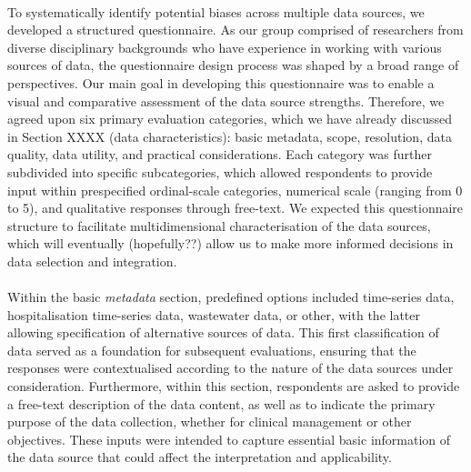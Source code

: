 \documentclass{article}
\begin{document}
\paragraph{}To systematically identify potential biases across multiple data sources, we developed a structured questionnaire. As our group comprised of researchers from diverse disciplinary backgrounds who have experience in working with various sources of data, the questionnaire design process was shaped by a broad range of perspectives. Our main goal in developing this questionnaire was to enable a visual and comparative assessment of the data source strengths. Therefore, we agreed upon six primary evaluation categories, which we have already discussed in Section XXXX (data characteristics): basic metadata, scope, resolution, data quality, data utility, and practical considerations. Each category was further subdivided into specific subcategories, which allowed respondents to provide input within prespecified ordinal-scale categories, numerical scale (ranging from 0 to 5), and qualitative responses through free-text. We expected this questionnaire structure to facilitate multidimensional characterisation of the data sources, which will eventually (hopefully??)  allow us to make more informed decisions in data selection and integration. 

\paragraph{}Within the basic \textit{metadata} section, predefined options included time-series data, hospitalisation time-series data, wastewater data, or other, with the latter allowing specification of alternative sources of data. This first classification of data served as a foundation for subsequent evaluations, ensuring that the responses were contextualised according to the nature of the data sources under consideration. Furthermore, within this section, respondents are asked to provide a free-text description of the data content, as well as to indicate the primary purpose of the data collection, whether for clinical management or other objectives. These inputs were intended to capture essential basic information of the data source that could affect the interpretation and applicability. 
\end{document}
